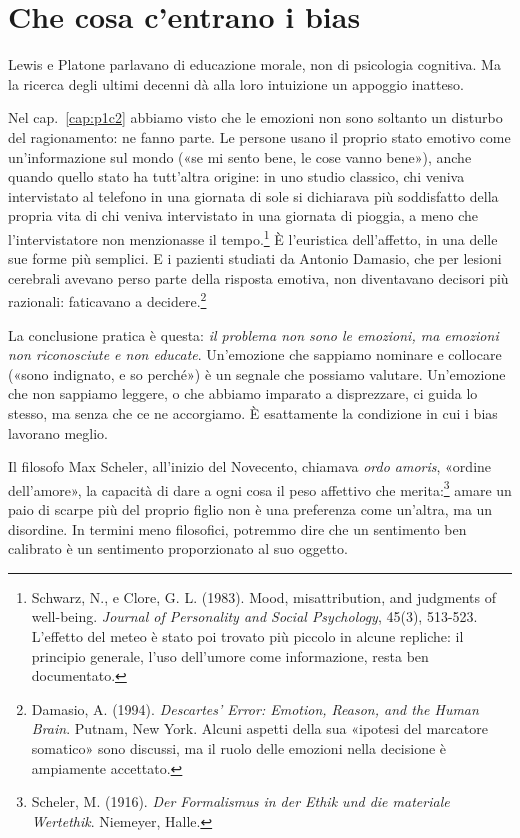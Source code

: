 \section{Che cosa c'entrano i bias}

Lewis e Platone parlavano di educazione morale, non di psicologia cognitiva. Ma la ricerca degli ultimi decenni dà alla loro intuizione un appoggio inatteso.

Nel cap.~\ref{cap:p1c2} abbiamo visto che le emozioni non sono soltanto un disturbo del ragionamento: ne fanno parte. Le persone usano il proprio stato emotivo come un'informazione sul mondo («se mi sento bene, le cose vanno bene»), anche quando quello stato ha tutt'altra origine: in uno studio classico, chi veniva intervistato al telefono in una giornata di sole si dichiarava più soddisfatto della propria vita di chi veniva intervistato in una giornata di pioggia, a meno che l'intervistatore non menzionasse il tempo.\footnote{Schwarz, N., e Clore, G. L. (1983). Mood, misattribution, and judgments of well-being. \textit{Journal of Personality and Social Psychology}, 45(3), 513-523. L'effetto del meteo è stato poi trovato più piccolo in alcune repliche: il principio generale, l'uso dell'umore come informazione, resta ben documentato.} È l'euristica dell'affetto, in una delle sue forme più semplici. E i pazienti studiati da Antonio Damasio, che per lesioni cerebrali avevano perso parte della risposta emotiva, non diventavano decisori più razionali: faticavano a decidere.\footnote{Damasio, A. (1994). \textit{Descartes' Error: Emotion, Reason, and the Human Brain}. Putnam, New York. Alcuni aspetti della sua «ipotesi del marcatore somatico» sono discussi, ma il ruolo delle emozioni nella decisione è ampiamente accettato.}

La conclusione pratica è questa: \textit{il problema non sono le emozioni, ma emozioni non riconosciute e non educate}. Un'emozione che sappiamo nominare e collocare («sono indignato, e so perché») è un segnale che possiamo valutare. Un'emozione che non sappiamo leggere, o che abbiamo imparato a disprezzare, ci guida lo stesso, ma senza che ce ne accorgiamo. È esattamente la condizione in cui i bias lavorano meglio.

Il filosofo Max Scheler, all'inizio del Novecento, chiamava \textit{ordo amoris}, «ordine dell'amore», la capacità di dare a ogni cosa il peso affettivo che merita:\footnote{Scheler, M. (1916). \textit{Der Formalismus in der Ethik und die materiale Wertethik}. Niemeyer, Halle.} amare un paio di scarpe più del proprio figlio non è una preferenza come un'altra, ma un disordine. In termini meno filosofici, potremmo dire che un sentimento ben calibrato è un sentimento proporzionato al suo oggetto.

